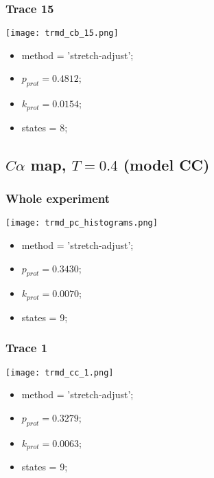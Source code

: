 \subsubsection{Trace 15}
\begin{minipage}[c]{0.7\textwidth}
	\texttt{[image: trmd\_cb\_15.png]}
\end{minipage}
\hfill
\begin{minipage}[c]{0.45\textwidth}
	\begin{itemize}
		\item method = 'stretch-adjust';
		\item $p_{prot}=0.4812$;
		\item $k_{prot}=0.0154$;
		\item states = 8;
	\end{itemize}
\end{minipage}


\subsection{$C\alpha$ map, $T=0.4$ (model CC)}
\subsubsection{Whole experiment}
\begin{minipage}[c]{0.7\textwidth}
    \texttt{[image: trmd\_pc\_histograms.png]}
\end{minipage}
\hfill
\begin{minipage}[c]{0.45\textwidth}
    \begin{itemize}
        \item method = 'stretch-adjust';
        \item $p_{prot}=0.3430$;
        \item $k_{prot}=0.0070$;
        \item states = 9;
    \end{itemize}
\end{minipage}

\subsubsection{Trace 1}
\begin{minipage}[c]{0.7\textwidth}
	\texttt{[image: trmd\_cc\_1.png]}
\end{minipage}
\hfill
\begin{minipage}[c]{0.45\textwidth}
	\begin{itemize}
		\item method = 'stretch-adjust';
		\item $p_{prot}=0.3279$;
		\item $k_{prot}=0.0063$;
		\item states = 9;
	\end{itemize}
\end{minipage}

